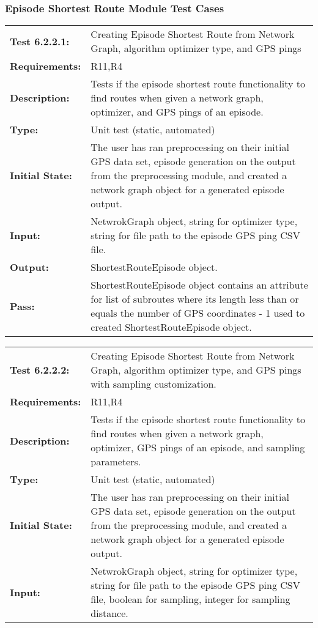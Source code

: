 \documentclass[12pt, titlepage]{article}
\begin{document}
{\subsubsection{Episode Shortest Route Module Test Cases}
\begin{tabular}{|l|p{10cm}|}
    \hline
    \bf{Test} 6.2.2.1: & Creating Episode Shortest Route from Network Graph, algorithm optimizer type, and GPS pings \\
    \bf{Requirements}: & R11,R4 \\
    \bf{Description}: & Tests if the episode shortest route functionality to find routes when given a network graph, optimizer, and GPS pings of an episode. \\
    \bf{Type}: & Unit test (static, automated) \\
    \bf{Initial State}: & The user has ran preprocessing on their initial GPS data set, episode generation on the output from the preprocessing module, and created a network graph object for a generated episode output. \\
    \bf{Input}: & NetwrokGraph object, string for optimizer type, string for file path to the episode GPS ping CSV file. \\
    \bf{Output}: & ShortestRouteEpisode object. \\
    \bf{Pass}: & ShortestRouteEpisode object contains an attribute for list of subroutes where its length less than or equals the number of GPS coordinates - 1 used to created ShortestRouteEpisode object. \\
    \hline
\end{tabular}
\begin{tabular}{|l|p{10cm}|}
    \hline
    \bf{Test} 6.2.2.2: & Creating Episode Shortest Route from Network Graph, algorithm optimizer type, and GPS pings with sampling customization. \\
    \bf{Requirements}: & R11,R4 \\
    \bf{Description}: & Tests if the episode shortest route functionality to find routes when given a network graph, optimizer, GPS pings of an episode, and sampling parameters. \\
    \bf{Type}: & Unit test (static, automated) \\
    \bf{Initial State}: & The user has ran preprocessing on their initial GPS data set, episode generation on the output from the preprocessing module, and created a network graph object for a generated episode output. \\
    \bf{Input}: & NetwrokGraph object, string for optimizer type, string for file path to the episode GPS ping CSV file, boolean for sampling, integer for sampling distance. \\

\end{tabular}}
\end{document}
